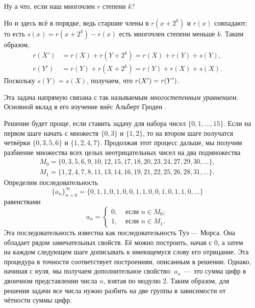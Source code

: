 Ну а что, если наш многочлен $r$ степени $k$?

Но и здесь всё в порядке, ведь старшие члены в $r(x+2^k)$ и $r(x)$ совпадают;
то есть $s(x)=r(x+2^k)-r(x)$ есть многочлен степени меньше $k$.
Таким образом,
\begin{align*}
r(X')&=r(X)+r(Y+2^k)=r(X)+r(Y)+s(Y),
\\
r(Y')&=r(Y)+r(X+2^k)=r(Y)+r(X)+s(X).
\end{align*}
Поскольку $s(Y)=s(X)$, получаем, что $r(X')\z=r(Y')$.

Эта задача напрямую связана с так называемым \emph{многостепенным уравнением}.
Основной вклад в его изучение внёс Альберт Гроден \cite{gloden}.

\begin{addedbytheeditors}
Решение будет проще, если ставить задачу для набора чисел $\{0,1,\ldots,15\}$. Если на первом шаге начать с множеств $\{0,3\}$ и $\{1,2\}$, то на втором шаге получатся четвёрки
$\{0,3,5,6\}$ и $\{1,2,4,7\}$. Продолжая этот процесс дальше, мы получим разбиение множества всех целых неотрицательных чисел на два подмножества
\begin{gather*}
    M_0=\{0, 3, 5, 6, 9, 10, 12, 15, 17, 18, 20, 23, 24, 27, 29, 30,\ldots\},\\
    M_1=\{1, 2, 4, 7, 8, 11, 13, 14, 16, 19, 21, 22, 25, 26, 28, 31, \ldots\}.
\end{gather*}
Определим последовательность $$\{a_n\}_{n=0}^\infty=\{0,1,1,0,1,0,0,1,1,0,0,1,0,1,1,0,\ldots\}$$ равенствами
$$a_n=\begin{cases}
0,&\text{ если }n\in M_0;\\
1,&\text{ если }n\in M_1.
\end{cases}$$
Эта последовательность известна как последовательность Туэ --- Морса.
Она обладает рядом замечательных свойств.
Её можно построить, начав с 0, а затем на каждом следующем шаге дописывать к имеющемуся слову его отрицание. Эта процедура в точности соответствует построениям, описанным в решении.
Однако, начиная с нуля, мы получаем дополнительное свойство: $a_n$~--- это сумма цифр в двоичном представлении числа $n$, взятая по модулю $2$.
Таким образом, для решения задачи все числа нужно разбить на две группы в зависимости от чётности суммы цифр. 


\end{addedbytheeditors}
